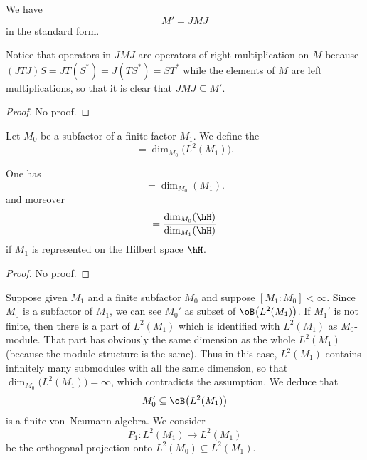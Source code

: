 \begin{lemma}
We have
\begin{equation}
	M'=JMJ
\end{equation}
in the standard form.
\end{lemma}
Notice that operators in $JMJ$ are operators of right multiplication on $M$ because $(JTJ)S=JT(S^*)=J(TS^*)=ST^*$ while the elements of $M$ are left multiplications, so that it is clear that $JMJ\subseteq M'$.

\begin{proof}
No proof.
\end{proof}

Let $M_0$ be a subfactor of a finite factor $M_1$. We define the 
\begin{equation}
	[M_1:M_0]=\dim_{M_0}\big( L^2(M_1) \big).
\end{equation}

\begin{theorem}
One has
\begin{equation}
	[M_1:M_0]=\dim_{M_0}(M_1).
\end{equation}
and moreover
\begin{equation}
	[M_1:M_0]=\frac{ \dim_{M_0}(\hH) }{   \dim_{M_1}(\hH) }
\end{equation}
 if $M_1$ is represented on the Hilbert space $\hH$.
\end{theorem}
\begin{proof}
No proof.
\end{proof}

Suppose given $M_1$ and a finite subfactor $M_0$ and suppose $[M_1:M_0]<\infty$. Since $M_0$ is a subfactor of $M_1$, we can see $M_0'$ as subset of $\oB\big( L^2(M_1) \big)$. If $M_1'$ is not finite, then there is a part of $L^2(M_1)$ which is identified with $L^2(M_1)$ as $M_0$-module. That part has obviously the same dimension as the whole $L^2(M_1)$ (because the module structure is the same). Thus in this case, $L^2(M_1)$ contains infinitely many submodules with all the same dimension, so that $\dim_{M_0}\big( L^2(M_1) \big)=\infty$, which contradicts the assumption. We deduce that
\begin{equation}
	M_0'\subseteq\oB\big( L^2(M_1) \big)
\end{equation}
is a finite von~Neumann algebra. We consider 
\begin{equation}
	P_1\colon L^2(M_1)\to L^2(M_1)
\end{equation}
be the orthogonal projection onto $L^2(M_0)\subseteq L^2(M_1)$. 


